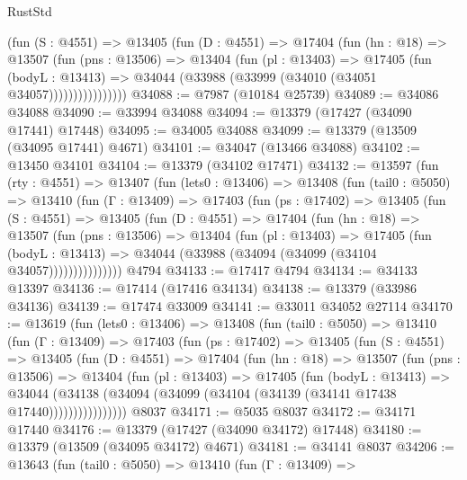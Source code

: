 \begin{lexlean}{RustStd}
\begin{coremodule}
                (fun (S : @4551) =>
                @13405
                  (fun (D : @4551) =>
                  @17404
                    (fun (hn : @18) =>
                    @13507
                      (fun (pns : @13506) =>
                      @13404
                        (fun (pl : @13403) =>
                        @17405
                          (fun (bodyL : @13413) =>
                          @34044 (@33988 (@33999 (@34010 (@34051 @34057))))))))))))))))
@34088 := @7987 (@10184 @25739)
@34089 := @34086 @34088
@34090 := @33994 @34088
@34094 := @13379 (@17427 (@34090 @17441) @17448)
@34095 := @34005 @34088
@34099 := @13379 (@13509 (@34095 @17441) @4671)
@34101 := @34047 (@13466 @34088)
@34102 := @13450 @34101
@34104 := @13379 (@34102 @17471)
@34132 := @13597
    (fun (rty : @4551) =>
    @13407
      (fun (lets0 : @13406) =>
      @13408
        (fun (tail0 : @5050) =>
        @13410
          (fun (Γ : @13409) =>
          @17403
            (fun (ps : @17402) =>
            @13405
              (fun (S : @4551) =>
              @13405
                (fun (D : @4551) =>
                @17404
                  (fun (hn : @18) =>
                  @13507
                    (fun (pns : @13506) =>
                    @13404
                      (fun (pl : @13403) =>
                      @17405
                        (fun (bodyL : @13413) =>
                        @34044 (@33988 (@34094 (@34099 (@34104 @34057)))))))))))))))
    @4794
@34133 := @17417 @4794
@34134 := @34133 @13397
@34136 := @17414 (@17416 @34134)
@34138 := @13379 (@33986 @34136)
@34139 := @17474 @33009
@34141 := @33011 @34052 @27114
@34170 := @13619
    (fun (lets0 : @13406) =>
    @13408
      (fun (tail0 : @5050) =>
      @13410
        (fun (Γ : @13409) =>
        @17403
          (fun (ps : @17402) =>
          @13405
            (fun (S : @4551) =>
            @13405
              (fun (D : @4551) =>
              @17404
                (fun (hn : @18) =>
                @13507
                  (fun (pns : @13506) =>
                  @13404
                    (fun (pl : @13403) =>
                    @17405
                      (fun (bodyL : @13413) =>
                      @34044
                        (@34138
                          (@34094 (@34099 (@34104 (@34139 (@34141 @17438 @17440))))))))))))))))
    @8037
@34171 := @5035 @8037
@34172 := @34171 @17440
@34176 := @13379 (@17427 (@34090 @34172) @17448)
@34180 := @13379 (@13509 (@34095 @34172) @4671)
@34181 := @34141 @8037
@34206 := @13643
    (fun (tail0 : @5050) =>
    @13410
      (fun (Γ : @13409) =>

\end{coremodule}
\end{lexlean}
